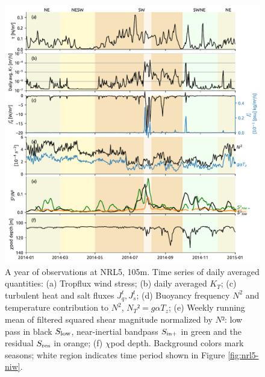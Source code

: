 \documentclass[onecol]{ametsoc}
\begin{document}
\begin{figure}
\centering
\includegraphics[width=\textwidth]{figure6-nrl5.pdf}
\caption{\label{fig:nrl}
A year of observations at NRL5, 105m. Time series of daily averaged quantities: (a) Tropflux wind stress; (b) daily averaged \(K_T\); (c) turbulent heat and salt fluxes \(J_q^t, J_s^t\); (d) Buoyancy frequency \(N^2\) and temperature contribution to \(N^2\), \(N_T² = g \alpha T_z\); (e) Weekly running mean of filtered squared shear magnitude normalized by $N²$: low pass in black $S_\text{low}$, near-inertial bandpass $S_\text{in+}$ in green and the residual $S_\text{res}$ in orange; (f) \(\chi\)pod depth. Background colors mark seasons; white region indicates time period shown in Figure \ref{fig:nrl5-niw}.}
\end{figure}
\end{document}
